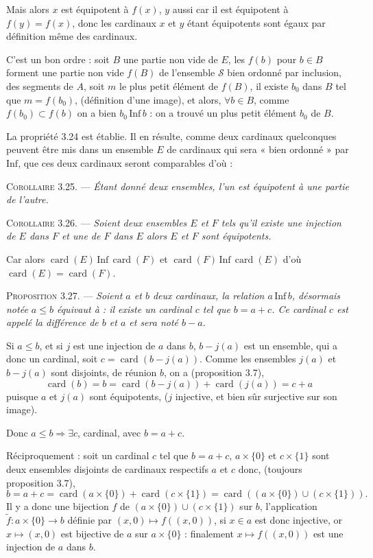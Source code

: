 Mais alors $x$ est équipotent à $f(x)$, $y$ aussi car il est équipotent à $f(y)=f(x)$, donc les cardinaux $x$ et $y$ étant équipotents sont égaux par définition même des cardinaux.

C'est un bon ordre : soit $B$ une partie non vide de $E$, les $f(b)$ pour $b\in B$ forment une partie non vide $f(B)$ de l'ensemble $\mathcal S$ bien ordonné par inclusion, des segments de $A$, soit $m$ le plus petit élément de $f(B)$, il existe $b_0$ dans $B$ tel que $m=f(b_0)$, (définition d'une image), et alors, $\forall b\in B$, comme $f(b_0)\subset f(b)$ on a bien $b_0\,\mathrm{Inf}\,b$ : on a trouvé un plus petit élément $b_0$ de $B$. \bookend

La propriété 3.24 est établie. Il en résulte, comme deux cardinaux quelconques peuvent être mis dans un ensemble $E$ de cardinaux qui sera « bien ordonné » par $\mathrm{Inf}$, que ces deux cardinaux seront comparables d'où :

\medskip\noindent\textsc{Corollaire 3.25.} --- \emph{Étant donné deux ensembles, l'un est équipotent à une partie de l'autre.}

\medskip\noindent\textsc{Corollaire 3.26.} --- \emph{Soient deux ensembles $E$ et $F$ tels qu'il existe une injection de $E$ dans $F$ et une de $F$ dans $E$ alors $E$ et $F$ sont équipotents.}

Car alors $\operatorname{card}(E)\,\mathrm{Inf}\,\operatorname{card}(F)$ et $\operatorname{card}(F)\,\mathrm{Inf}\,\operatorname{card}(E)$ d'où $\operatorname{card}(E)=\operatorname{card}(F)$.

\medskip\noindent\textsc{Proposition 3.27.} --- \emph{Soient $a$ et $b$ deux cardinaux, la relation $a\,\mathrm{Inf}\,b$, désormais notée $a\le b$ équivaut à : il existe un cardinal $c$ tel que $b=a+c$. Ce cardinal $c$ est appelé la différence de $b$ et $a$ et sera noté $b-a$.}

Si $a\le b$, et si $j$ est une injection de $a$ dans $b$, $b-j(a)$ est un ensemble, qui a donc un cardinal, soit $c=\operatorname{card}(b-j(a))$. Comme les ensembles $j(a)$ et $b-j(a)$ sont disjoints, de réunion $b$, on a (proposition 3.7),
\[
\operatorname{card}(b)=b=\operatorname{card}(b-j(a))+\operatorname{card}(j(a))=c+a
\]
puisque $a$ et $j(a)$ sont équipotents, ($j$ injective, et bien sûr surjective sur son image).

Donc $a\le b\Rightarrow\exists c$, cardinal, avec $b=a+c$.

Réciproquement : soit un cardinal $c$ tel que $b=a+c$, $a\times\{0\}$ et $c\times\{1\}$ sont deux ensembles disjoints de cardinaux respectifs $a$ et $c$ donc, (toujours proposition 3.7),
\[
b=a+c=\operatorname{card}(a\times\{0\})+\operatorname{card}(c\times\{1\})
=\operatorname{card}((a\times\{0\})\cup(c\times\{1\})).
\]
Il y a donc une bijection $f$ de $(a\times\{0\})\cup(c\times\{1\})$ sur $b$, l'application $\tilde f:a\times\{0\}\longrightarrow b$ définie par $(x,0)\mapsto f((x,0))$, si $x\in a$ est donc injective, or $x\mapsto(x,0)$ est bijective de $a$ sur $a\times\{0\}$ : finalement $x\mapsto f((x,0))$ est une injection de $a$ dans $b$. \bookend

